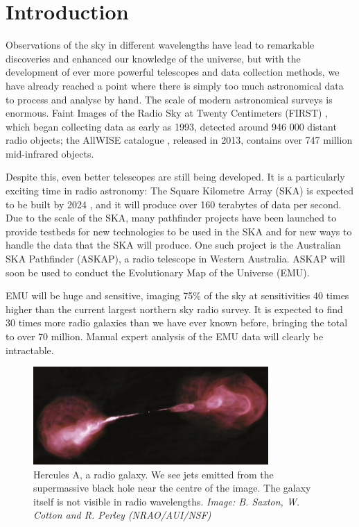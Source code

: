 
\chapter{Introduction}
\label{cha:intro}

Observations of the sky in different wavelengths have lead to remarkable
discoveries and enhanced our knowledge of the universe, but with the development
of ever more powerful telescopes and data collection methods, we have already
reached a point where there is simply too much astronomical data to process and
analyse by hand. The scale of modern astronomical surveys is enormous. Faint
Images of the Radio Sky at Twenty Centimeters (FIRST) \citep{becker95}, which
began collecting data as early as 1993, detected around 946 000 distant radio
objects; the AllWISE catalogue \citep{cutri13}, released in 2013, contains over
747 million mid-infrared objects.

Despite this, even better telescopes are still being developed. It is a
particularly exciting time in radio astronomy: The Square Kilometre Array (SKA)
is expected to be built by 2024 \citep{ska}, and it will produce over 160
terabytes of data per second. Due to the scale of the SKA, many pathfinder
projects have been launched to provide testbeds for new technologies to be used
in the SKA and for new ways to handle the data that the SKA will produce. One
such project is the Australian SKA Pathfinder (ASKAP), a radio telescope in
Western Australia. ASKAP will soon be used to conduct the Evolutionary Map of
the Universe (EMU).

EMU will be huge and sensitive, imaging 75\% of the sky at sensitivities 40
times higher than the current largest northern sky radio survey. It is expected
to find 30 times more radio galaxies than we have ever known before, bringing
the total to over 70 million. Manual expert analysis of the EMU data will
clearly be intractable.

\begin{figure}
  \centering
  \includegraphics[width=0.8\textwidth]{images/herculesA.jpg}
  \caption{Hercules A, a radio galaxy. We see jets emitted from the supermassive
    black hole near the centre of the image. The galaxy itself is not visible in
    radio wavelengths. \emph{Image: B. Saxton, W. Cotton and R. Perley
    (NRAO/AUI/NSF)}}
  \label{fig:radio-galaxy}
\end{figure}

